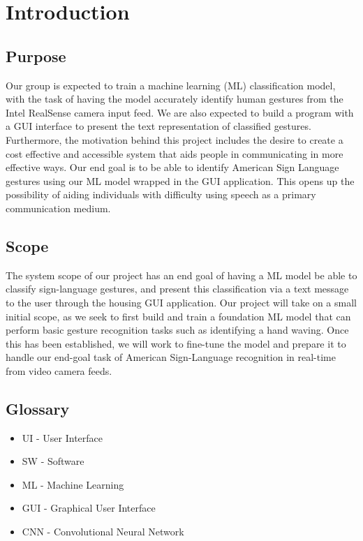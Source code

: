 \documentclass[onecolumn, draftclsnofoot,10pt, compsoc]{IEEEtran}
\begin{document}
\begin{titlepage}
\begin{singlespace}
\begin{abstract}
        \end{abstract}     
    \end{singlespace}
\end{titlepage}
\newpage
{}
\tableofcontents
\clearpage


\section{Introduction}
\subsection{Purpose}
Our group is expected to train a machine learning (ML) classification model, with the task of having the model accurately identify human gestures from the Intel RealSense camera input feed. We are also expected to build a program with a GUI interface to present the text representation of classified gestures. Furthermore, the motivation behind this project includes the desire to create a cost effective and accessible system that aids people in communicating in more effective ways. Our end goal is to be able to identify American Sign Language gestures using our ML model wrapped in the GUI application. This opens up the possibility of aiding individuals with difficulty using speech as a primary communication medium.
\subsection{Scope}
The system scope of our project has an end goal of having a ML model be able to classify sign-language gestures, and present this classification via a text message to the user through the housing GUI application. Our project will take on a small initial scope, as we seek to first build and train a foundation ML model that can perform basic gesture recognition tasks such as identifying a hand waving. Once this has been established, we will work to fine-tune the model and prepare it to handle our end-goal task of American Sign-Language recognition in real-time from video camera feeds.

\subsection{Glossary}
\begin{itemize}
    \item UI - User Interface
    \item SW - Software
    \item ML - Machine Learning
    \item GUI - Graphical User Interface
    \item CNN - Convolutional Neural Network
\end{itemize}
\end{document}
